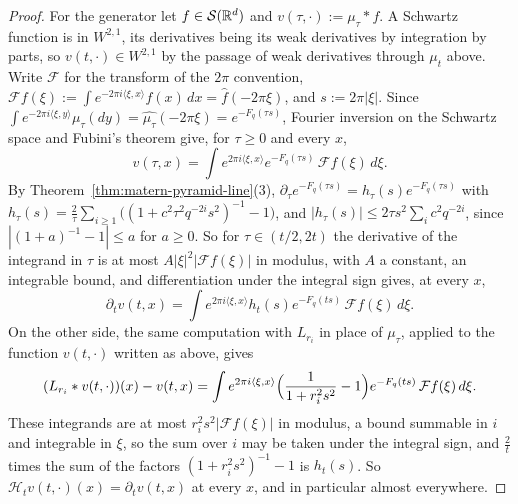 \begin{proof}
For the generator let $f \in \mathcal{S}(\mathbb{R}^d)$ and $v(\tau, \cdot) := \mu_\tau * f$. A Schwartz
function is in $W^{2,1}$, its derivatives being its weak derivatives by integration by parts, so
$v(t, \cdot) \in W^{2,1}$ by the passage of weak derivatives through $\mu_t$ above. Write
$\mathcal{F}$ for the transform of the $2\pi$ convention, $\mathcal{F}f(\xi) := \int e^{-2\pi
i\langle\xi, x\rangle}f(x)\,dx = \widehat f(-2\pi\xi)$, and $s := 2\pi|\xi|$. Since
$\int e^{-2\pi i\langle\xi, y\rangle}\mu_\tau(dy) = \widehat{\mu_\tau}(-2\pi\xi) = e^{-F_q(\tau s)}$,
Fourier inversion on the Schwartz space and Fubini's theorem give, for $\tau \ge 0$ and every $x$,
\[
  v(\tau, x) = \int e^{2\pi i\langle\xi, x\rangle}e^{-F_q(\tau s)}\,
    \mathcal{F}f(\xi)\,d\xi .
\]
By Theorem~\ref{thm:matern-pyramid-line}(3), $\partial_\tau e^{-F_q(\tau s)} = h_\tau(s)e^{-F_q(\tau s)}$
with $h_\tau(s) = \frac2\tau\sum_{i \ge 1}\bigl((1 + c^2\tau^2q^{-2i}s^2)^{-1} - 1\bigr)$, and
$|h_\tau(s)| \le 2\tau s^2\sum_ic^2q^{-2i}$, since $|(1 + a)^{-1} - 1| \le a$ for $a \ge 0$. So for
$\tau \in (t/2, 2t)$ the derivative of the integrand in $\tau$ is at most $A|\xi|^2|\mathcal{F}f(\xi)|$
in modulus, with $A$ a constant, an integrable bound, and differentiation under the integral sign
gives, at every $x$,
\[
  \partial_tv(t, x) = \int e^{2\pi i\langle\xi, x\rangle}h_t(s)e^{-F_q(ts)}\,
    \mathcal{F}f(\xi)\,d\xi .
\]
On the other side, the same computation with $L_{r_i}$ in place of $\mu_\tau$, applied to the
function $v(t, \cdot)$ written as above, gives
\[
  (L_{r_i} * v(t, \cdot))(x) - v(t, x)
   = \int e^{2\pi i\langle\xi, x\rangle}\Bigl(\frac{1}{1 + r_i^2s^2} - 1\Bigr)
     e^{-F_q(ts)}\,\mathcal{F}f(\xi)\,d\xi .
\]
These integrands are at most $r_i^2s^2|\mathcal{F}f(\xi)|$ in modulus, a bound summable in $i$ and
integrable in $\xi$, so the sum over $i$ may be taken under the integral sign, and $\frac2t$ times the
sum of the factors $(1 + r_i^2s^2)^{-1} - 1$ is $h_t(s)$. So
$\mathcal{H}_tv(t, \cdot)(x) = \partial_tv(t, x)$ at every $x$, and in particular almost everywhere.


\end{proof}
